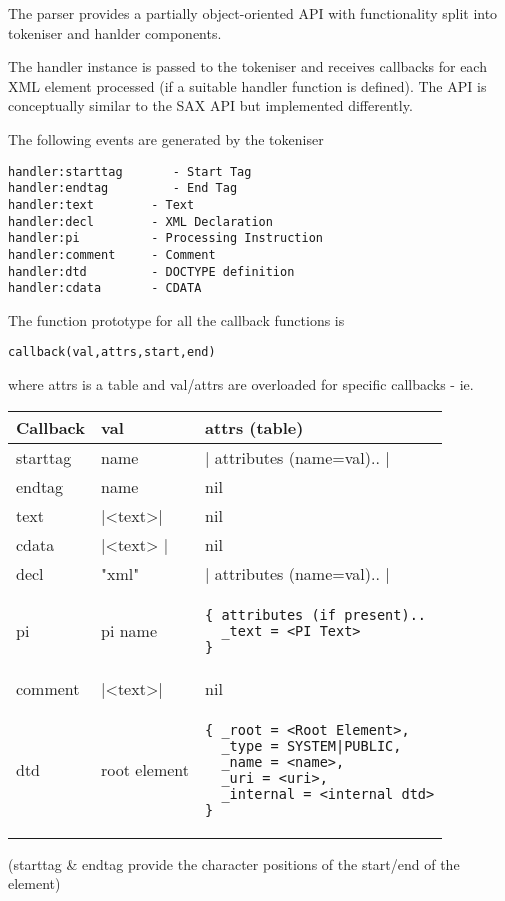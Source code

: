 \documentclass{ltxdoc}
\begin{document}
The parser provides a partially object-oriented API with functionality
split into tokeniser and hanlder components.

The handler instance is passed to the tokeniser and receives callbacks
for each XML element processed (if a suitable handler function is
defined). The API is conceptually similar to the SAX API but implemented
differently.

The following events are generated by the tokeniser

\begin{verbatim}
handler:starttag       - Start Tag
handler:endtag         - End Tag
handler:text        - Text
handler:decl        - XML Declaration
handler:pi          - Processing Instruction
handler:comment     - Comment
handler:dtd         - DOCTYPE definition
handler:cdata       - CDATA 
\end{verbatim}
The function prototype for all the callback functions is

\begin{verbatim}
callback(val,attrs,start,end)
\end{verbatim}
where attrs is a table and val/attrs are overloaded for specific
callbacks - ie.

\begin{tabular}{llp{5cm}}
Callback   &  val        &    attrs (table)\\
\hline
starttag     &   name &   |{ attributes (name=val).. }|\\
endtag       &   name   &    nil\\
text      &   |<text>| &   nil\\
cdata     &   |<text> |  &   nil\\
decl      &   "xml"       &   |{ attributes (name=val).. }|\\
pi        &   pi name     &  \begin{verbatim}{ attributes (if present)..
  _text = <PI Text>
}\end{verbatim}\\
comment   &   |<text>|      &   nil\\     
dtd       &   root element  & \begin{verbatim}{ _root = <Root Element>,
  _type = SYSTEM|PUBLIC,
  _name = <name>,
  _uri = <uri>,
  _internal = <internal dtd>
}\end{verbatim}\\
\end{tabular}

(starttag \& endtag provide the character positions of the start/end of the
element)
\end{document}
